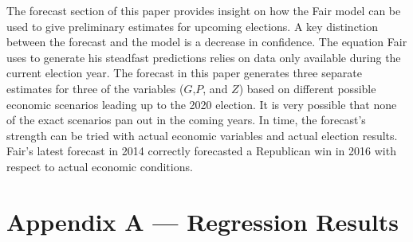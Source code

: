 \documentclass[11,]{article}
\begin{document}
The forecast section of this paper provides insight on how the Fair
model can be used to give preliminary estimates for upcoming elections.
A key distinction between the forecast and the model is a decrease in
confidence. The equation Fair uses to generate his steadfast predictions
relies on data only available during the current election year. The
forecast in this paper generates three separate estimates for three of
the variables (\(G\),\(P\), and \(Z\)) based on different possible
economic scenarios leading up to the 2020 election. It is very possible
that none of the exact scenarios pan out in the coming years. In time,
the forecast's strength can be tried with actual economic variables and
actual election results. Fair's latest forecast in 2014 correctly
forecasted a Republican win in 2016 with respect to actual economic
conditions.

\clearpage

\hypertarget{appendix-a-regression-results}{%
\section{Appendix A --- Regression
Results}\label{appendix-a-regression-results}}
\end{document}
